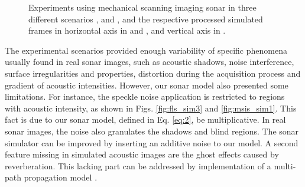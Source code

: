 \documentclass[final,5p,times]{elsarticle}
\begin{document}
\begin{figure}[!ht]
{        \label{fig:msis_sim2}
    }
    \captionsetup{justification=centering}
    \caption{Experiments using mechanical scanning imaging sonar in three
    different scenarios , 
    and , and the respective processed simulated
    frames in horizontal axis in  and
    , and vertical axis in .}
    \label{fig:msis}
\end{figure}

The experimental scenarios provided enough variability of specific phenomena
usually found in real sonar images, such as acoustic shadows, noise
interference, surface irregularities and properties, distortion during
the acquisition process and gradient of acoustic intensities. However, our
sonar model also presented some limitations. For instance, the speckle noise
application is restricted to regions with acoustic intensity, as shown in
Figs. \ref{fig:fls_sim3} and \ref{fig:msis_sim1}. This fact is due to our
sonar model, defined in Eq. \ref{eq:2}, be multiplicative. In real sonar
images, the noise also granulates the shadows and blind regions. The sonar
simulator can be improved by inserting an additive noise to our model.
A second feature missing in simulated acoustic images are the ghost effects
caused by reverberation. This lacking part can be addressed by implementation
of a multi-path propagation model \cite{huang2015b}.
\end{document}
